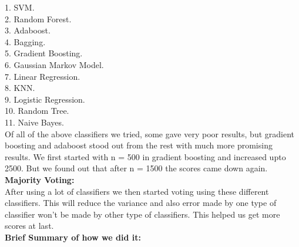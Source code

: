 \documentclass{article}
\begin{document}
1. SVM.\\
2. Random Forest.\\
3. Adaboost.\\
4. Bagging.\\
5. Gradient Boosting.\\
6. Gaussian Markov Model.\\
7. Linear Regression.\\
8. KNN.\\
9. Logistic Regression.\\
10. Random Tree.\\
11. Naive Bayes.\\

Of all of the above classifiers we tried, some gave very poor results, but gradient boosting and adaboost stood out from the rest with much more promising results. We first started with n = 500 in gradient boosting and increased upto 2500. But we found out that after n = 1500 the scores came down again.\\

{\bf Majority Voting:}\\

After using a lot of classifiers we then started voting using these different classifiers. This will reduce the variance and also error made by one type of classifier won't be made by other type of classifiers. This helped us get more scores at last.\\
 
{\bf Brief Summary of how we did it:}\\
\end{document}
